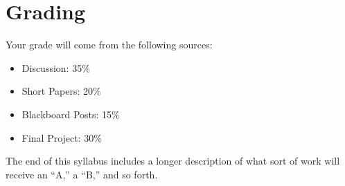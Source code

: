 \section{Grading}

Your grade will come from the following sources:

\begin{itemize}
\item
  Discussion: 35\%
\item
  Short Papers: 20\%
\item
  Blackboard Posts: 15\%
\item
  Final Project: 30\%
\end{itemize}

The end of this syllabus includes a longer description of what sort of
work will receive an ``A,'' a ``B,'' and so forth.

